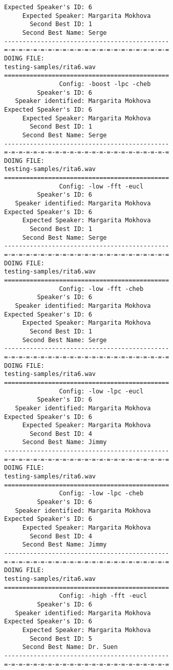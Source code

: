 \begin{verbatim}
Expected Speaker's ID: 6
     Expected Speaker: Margarita Mokhova
       Second Best ID: 1
     Second Best Name: Serge
---------------------------------------------
=-=-=-=-=-=-=-=-=-=-=-=-=-=-=-=-=-=-=-=-=-=-=
DOING FILE:
testing-samples/rita6.wav
=============================================
               Config: -boost -lpc -cheb
         Speaker's ID: 6
   Speaker identified: Margarita Mokhova
Expected Speaker's ID: 6
     Expected Speaker: Margarita Mokhova
       Second Best ID: 1
     Second Best Name: Serge
---------------------------------------------
=-=-=-=-=-=-=-=-=-=-=-=-=-=-=-=-=-=-=-=-=-=-=
DOING FILE:
testing-samples/rita6.wav
=============================================
               Config: -low -fft -eucl
         Speaker's ID: 6
   Speaker identified: Margarita Mokhova
Expected Speaker's ID: 6
     Expected Speaker: Margarita Mokhova
       Second Best ID: 1
     Second Best Name: Serge
---------------------------------------------
=-=-=-=-=-=-=-=-=-=-=-=-=-=-=-=-=-=-=-=-=-=-=
DOING FILE:
testing-samples/rita6.wav
=============================================
               Config: -low -fft -cheb
         Speaker's ID: 6
   Speaker identified: Margarita Mokhova
Expected Speaker's ID: 6
     Expected Speaker: Margarita Mokhova
       Second Best ID: 1
     Second Best Name: Serge
---------------------------------------------
=-=-=-=-=-=-=-=-=-=-=-=-=-=-=-=-=-=-=-=-=-=-=
DOING FILE:
testing-samples/rita6.wav
=============================================
               Config: -low -lpc -eucl
         Speaker's ID: 6
   Speaker identified: Margarita Mokhova
Expected Speaker's ID: 6
     Expected Speaker: Margarita Mokhova
       Second Best ID: 4
     Second Best Name: Jimmy
---------------------------------------------
=-=-=-=-=-=-=-=-=-=-=-=-=-=-=-=-=-=-=-=-=-=-=
DOING FILE:
testing-samples/rita6.wav
=============================================
               Config: -low -lpc -cheb
         Speaker's ID: 6
   Speaker identified: Margarita Mokhova
Expected Speaker's ID: 6
     Expected Speaker: Margarita Mokhova
       Second Best ID: 4
     Second Best Name: Jimmy
---------------------------------------------
=-=-=-=-=-=-=-=-=-=-=-=-=-=-=-=-=-=-=-=-=-=-=
DOING FILE:
testing-samples/rita6.wav
=============================================
               Config: -high -fft -eucl
         Speaker's ID: 6
   Speaker identified: Margarita Mokhova
Expected Speaker's ID: 6
     Expected Speaker: Margarita Mokhova
       Second Best ID: 5
     Second Best Name: Dr. Suen
---------------------------------------------
=-=-=-=-=-=-=-=-=-=-=-=-=-=-=-=-=-=-=-=-=-=-=

\end{verbatim}
